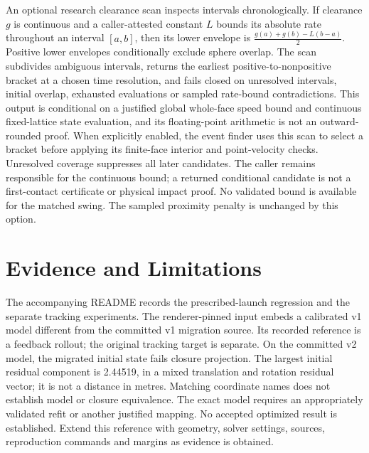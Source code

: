 \documentclass{article}
\begin{document}
An optional research clearance scan inspects intervals chronologically. If
clearance $g$ is continuous and a caller-attested constant $L$ bounds its
absolute rate throughout an interval $[a,b]$, then its lower envelope is
$\frac{g(a)+g(b)-L(b-a)}{2}$. Positive lower envelopes conditionally exclude
sphere overlap. The scan subdivides ambiguous intervals, returns the earliest
positive-to-nonpositive bracket at a chosen time resolution, and fails closed
on unresolved intervals, initial overlap, exhausted evaluations or sampled
rate-bound contradictions. This output is conditional on a justified global
whole-face speed bound and continuous fixed-lattice state evaluation, and its
floating-point arithmetic is not an outward-rounded proof. When explicitly enabled, the event finder uses this scan to select a bracket
before applying its finite-face interior and point-velocity checks. Unresolved
coverage suppresses all later candidates. The caller remains responsible for
the continuous bound; a returned conditional candidate is not a first-contact
certificate or physical impact proof. No validated bound is available for the
matched swing. The sampled proximity penalty is unchanged by this option.

\section{Evidence and Limitations}
The accompanying README records the prescribed-launch regression and the
separate tracking experiments. The renderer-pinned input embeds a calibrated
v1 model different from the committed v1 migration source. Its recorded
reference is a feedback rollout; the original tracking target is separate.
On the committed v2 model, the migrated initial state fails closure projection.
The largest initial residual component is 2.44519, in a mixed translation and
rotation residual vector; it is not a distance in metres. Matching coordinate
names does not establish model or closure equivalence. The exact model requires
an appropriately validated refit or another justified mapping. No accepted
optimized result is established. Extend this reference with geometry, solver
settings, sources, reproduction commands and margins as evidence is obtained.
\end{document}
